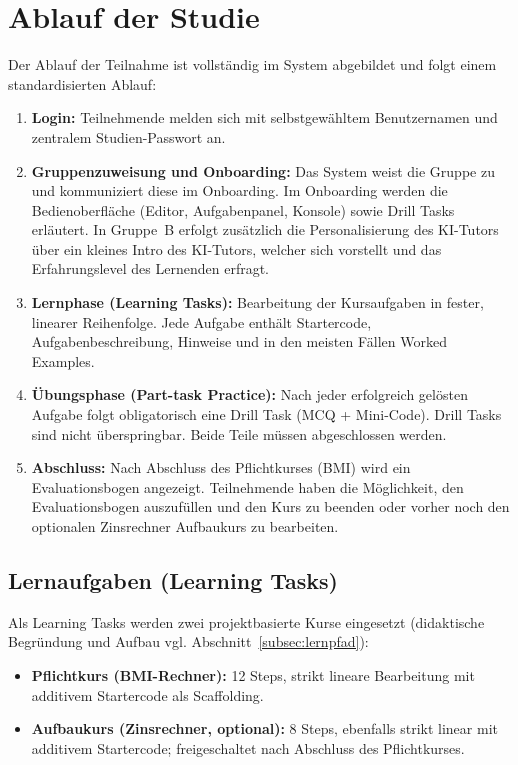 \section{Ablauf der Studie}\label{sec:ablauf}

Der Ablauf der Teilnahme ist vollständig im System abgebildet und folgt einem standardisierten Ablauf:

\begin{enumerate}
    \item \textbf{Login:} Teilnehmende melden sich mit selbstgewähltem Benutzernamen und zentralem Studien-Passwort an.
    \item \textbf{Gruppenzuweisung und Onboarding:} Das System weist die Gruppe zu und kommuniziert diese im Onboarding. Im Onboarding werden die Bedienoberfläche (Editor, Aufgabenpanel, Konsole) sowie Drill Tasks erläutert. In Gruppe~B erfolgt zusätzlich die Personalisierung des KI-Tutors über ein kleines Intro des KI-Tutors, welcher sich vorstellt und das Erfahrungslevel des Lernenden erfragt.
    \item \textbf{Lernphase (Learning Tasks):} Bearbeitung der Kursaufgaben in fester, linearer Reihenfolge. Jede Aufgabe enthält Startercode, Aufgabenbeschreibung, Hinweise und in den meisten Fällen Worked Examples.
    \item \textbf{Übungsphase (Part-task Practice):} Nach jeder erfolgreich gelösten Aufgabe folgt obligatorisch eine Drill Task (MCQ + Mini-Code). Drill Tasks sind nicht überspringbar. Beide Teile müssen abgeschlossen werden.
    \item \textbf{Abschluss:} Nach Abschluss des Pflichtkurses (BMI) wird ein Evaluationsbogen angezeigt. Teilnehmende haben die Möglichkeit, den Evaluationsbogen auszufüllen und den Kurs zu beenden oder vorher noch den optionalen Zinsrechner Aufbaukurs zu bearbeiten.
\end{enumerate}

\subsection{Lernaufgaben (Learning Tasks)}\label{subsec:learning_tasks_studie}

Als Learning Tasks werden zwei projektbasierte Kurse eingesetzt (didaktische Begründung und Aufbau vgl. Abschnitt~\ref{subsec:lernpfad}):

\begin{itemize}
    \item \textbf{Pflichtkurs (BMI-Rechner):} 12 Steps, strikt lineare Bearbeitung mit additivem Startercode als Scaffolding.
    \item \textbf{Aufbaukurs (Zinsrechner, optional):} 8 Steps, ebenfalls strikt linear mit additivem Startercode; freigeschaltet nach Abschluss des Pflichtkurses.
\end{itemize}

